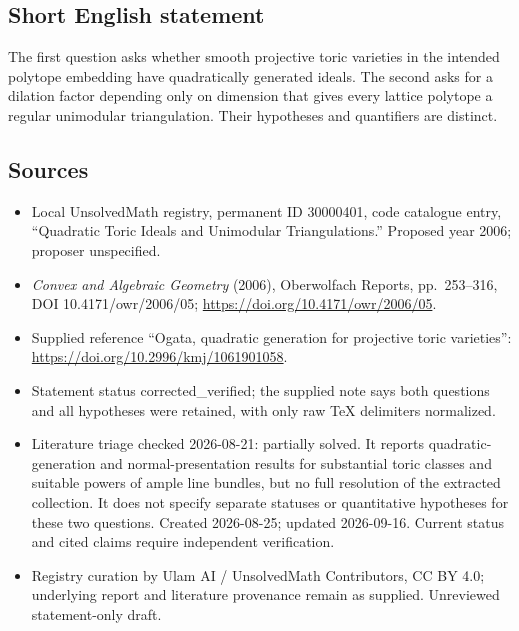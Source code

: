 \documentclass[11pt]{article}
\begin{document}
\subsection{Short English statement}
The first question asks whether smooth projective toric varieties in the intended polytope embedding have quadratically generated ideals. The second asks for a dilation factor depending only on dimension that gives every lattice polytope a regular unimodular triangulation. Their hypotheses and quantifiers are distinct.
\subsection{Sources}
\begin{itemize}
\item Local UnsolvedMath registry, permanent ID 30000401, code catalogue entry, ``Quadratic Toric Ideals and Unimodular Triangulations.'' Proposed year 2006; proposer unspecified.
\item \emph{Convex and Algebraic Geometry} (2006), Oberwolfach Reports, pp.\ 253--316, DOI 10.4171/owr/2006/05; \url{https://doi.org/10.4171/owr/2006/05}.
\item Supplied reference ``Ogata, quadratic generation for projective toric varieties'': \url{https://doi.org/10.2996/kmj/1061901058}.
\item Statement status corrected\_verified; the supplied note says both questions and all hypotheses were retained, with only raw TeX delimiters normalized.
\item Literature triage checked 2026-08-21: partially solved. It reports quadratic-generation and normal-presentation results for substantial toric classes and suitable powers of ample line bundles, but no full resolution of the extracted collection. It does not specify separate statuses or quantitative hypotheses for these two questions. Created 2026-08-25; updated 2026-09-16. Current status and cited claims require independent verification.
\item Registry curation by Ulam AI / UnsolvedMath Contributors, CC BY 4.0; underlying report and literature provenance remain as supplied. Unreviewed statement-only draft.
\end{itemize}
\end{document}
